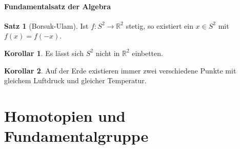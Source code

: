 \documentclass[a4paper,11pt,notitlepage]{report}
\theoremstyle{definition}
\newtheorem{theorem}{Satz}[chapter]
\newtheorem{corollary}{Korollar}[chapter]
\newcommand{\R}{{\ensuremath{\mathbb{R}}}}
\begin{document}
\paragraph{Fundamentalsatz der Algebra}

\begin{theorem}[Borsuk-Ulam]
	Ist $f \colon S^2 \rightarrow \R^2$ stetig, so existiert ein $x \in S^2$ mit $f(x) = f(-x)$.
\end{theorem}

\begin{corollary}
	Es lässt sich $S^2$ nicht in $\R^2$ einbetten.
\end{corollary}

\begin{corollary}
	Auf der Erde existieren immer zwei verschiedene Punkte mit gleichem Luftdruck und gleicher Temperatur.	
\end{corollary}

\section{Homotopien und Fundamentalgruppe}
\end{document}
